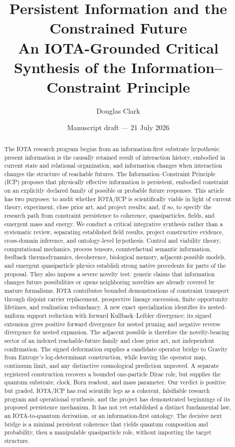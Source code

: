 \documentclass[10pt]{article}
\title{\vspace{-1.2em}\textbf{Persistent Information and the Constrained Future}\\
\large An IOTA-Grounded Critical Synthesis of the Information--Constraint Principle}
\author{Douglas Clark}
\date{Manuscript draft --- 21 July 2026}
\begin{document}
\maketitle

\begin{abstract}
The IOTA research program begins from an information-first substrate
hypothesis: present information is the causally retained result of interaction
history, embodied in current state and relational organization, and information
changes when interaction changes the structure of reachable futures. The
Information--Constraint Principle (ICP) proposes that physically effective
information is persistent, embodied constraint on an explicitly declared family
of possible or probable future responses. This article has two purposes: to
audit whether IOTA/ICP is scientifically viable in light of current theory,
experiment, close prior art, and project results; and, if so, to specify the
research path from constraint persistence to coherence, quasiparticles, fields,
and emergent mass and energy. We conduct a critical integrative synthesis rather
than a systematic review, separating established field results, project
constructive evidence, cross-domain inference, and ontology-level hypothesis.
Control and viability theory, computational mechanics, process tensors,
counterfactual semantic information, feedback thermodynamics, decoherence,
biological memory, adjacent-possible models, and emergent quasiparticle physics
establish strong native precedents for parts of the proposal. They also impose
a severe novelty test: generic claims that information changes future
possibilities or opens neighboring novelties are already covered by mature
formalisms. IOTA contributes bounded demonstrations of
constraint transport through disjoint carrier replacement, prospective lineage
succession, finite opportunity lifetimes, and realization redundancy. A new
exact specialization identifies its nested-uniform support reduction with
forward Kullback--Leibler divergence; its signed extension gives positive
forward divergence for nested pruning and negative reverse divergence for
nested expansion. The adjacent possible is therefore the novelty-bearing
sector of an indexed reachable-future family and close prior art, not
independent confirmation. The signed deformation supplies a candidate operator
bridge to Gravity from Entropy's log-determinant construction, while leaving
the operator map, continuum limit, and any distinctive cosmological prediction
unproved. A separate registered
construction recovers a bounded one-particle Dirac role,
but supplies the quantum substrate, clock, Born readout, and mass parameter.
Our verdict is positive but graded. IOTA/ICP has real scientific legs as a
coherent, falsifiable research program and operational synthesis, and the
project has demonstrated beginnings of its proposed persistence mechanism. It
has not yet established a distinct fundamental law, an IOTA-to-quantum
derivation, or an information-first ontology. The decisive next bridge is a
minimal persistent coherence that yields quantum composition and probability,
then a manipulable quasiparticle role, without importing the target structure.
\end{abstract}
\end{document}
